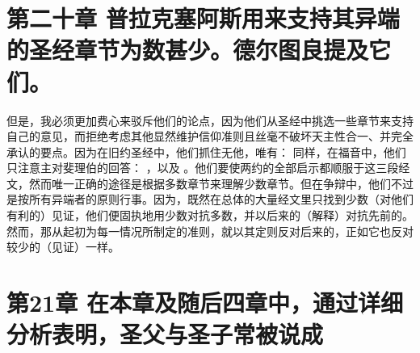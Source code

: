 
\section{第二十章 普拉克塞阿斯用来支持其异端的圣经章节为数甚少。德尔图良提及它们。}

但是，我必须更加费心来驳斥他们的论点，因为他们从圣经中挑选一些章节来支持自己的意见，而拒绝考虑其他显然维护信仰准则且丝毫不破坏天主性合一、并完全承认的要点。因为在旧约圣经中，他们抓住无他，唯有： 同样，在福音中，他们只注意主对斐理伯的回答： ，以及 。他们要使两约的全部启示都顺服于这三段经文，然而唯一正确的途径是根据多数章节来理解少数章节。但在争辩中，他们不过是按所有异端者的原则行事。因为，既然在总体的大量经文里只找到少数（对他们有利的）见证，他们便固执地用少数对抗多数，并以后来的（解释）对抗先前的。然而，那从起初为每一情况所制定的准则，就以其定则反对后来的，正如它也反对较少的（见证）一样。\par


\section{第21章 在本章及随后四章中，通过详细分析表明，圣父与圣子常被说成}


